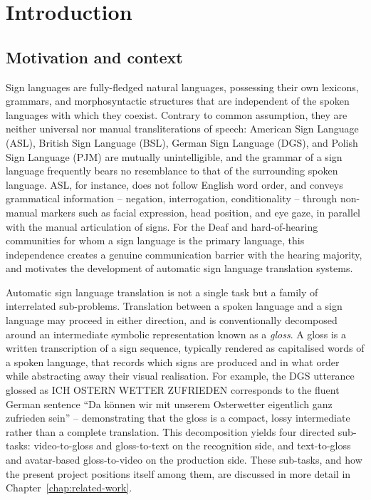 
\section{Introduction}
\label{chap:introduction}

\subsection{Motivation and context}
\label{sec:motivation-context}

Sign languages are fully-fledged natural languages, possessing their own lexicons,
grammars, and morphosyntactic structures that are independent of the spoken
languages with which they coexist. Contrary to common assumption, they are neither
universal nor manual transliterations of speech: American Sign Language (ASL),
British Sign Language (BSL), German Sign Language (DGS), and Polish Sign Language
(PJM) are mutually unintelligible, and the grammar of a sign language frequently
bears no resemblance to that of the surrounding spoken language. ASL, for instance,
does not follow English word order, and conveys grammatical information --
negation, interrogation, conditionality -- through non-manual markers such as
facial expression, head position, and eye gaze, in parallel with the manual
articulation of signs. For the Deaf and hard-of-hearing communities for whom a
sign language is the primary language, this independence creates a genuine
communication barrier with the hearing majority, and motivates the development of
automatic sign language translation systems.

Automatic sign language translation is not a single task but a family of
interrelated sub-problems. Translation between a spoken language and a sign
language may proceed in either direction, and is conventionally decomposed around
an intermediate symbolic representation known as a \emph{gloss}. A gloss is a
written transcription of a sign sequence, typically rendered as capitalised words
of a spoken language, that records which signs are produced and in what order
while abstracting away their visual realisation. For example, the DGS utterance
glossed as ICH OSTERN WETTER ZUFRIEDEN corresponds to the fluent German sentence
``Da k\"onnen wir mit unserem Osterwetter eigentlich ganz zufrieden sein'' --
demonstrating that the gloss is a compact, lossy intermediate rather than a
complete translation. This decomposition yields four directed sub-tasks:
video-to-gloss and gloss-to-text on the recognition side, and text-to-gloss and
avatar-based gloss-to-video on the production side. These sub-tasks, and how the
present project positions itself among them, are discussed in more detail in
Chapter~\ref{chap:related-work}.

